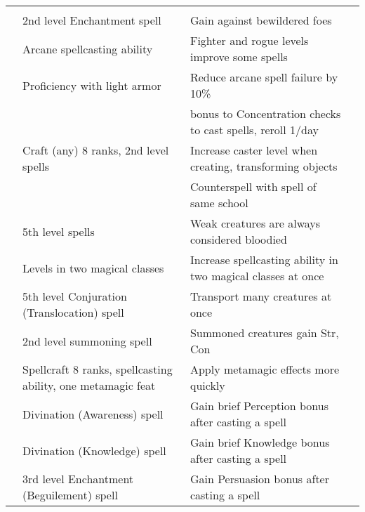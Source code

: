 {\begin{longtabu}{>{\lcol}p{10em} >{\lcol}p{15em} >{\lcol}X >{\lcol}p{3em}}
    \midrule
     &  &  &  \\
     & 2nd level Enchantment spell & Gain  against bewildered foes &  \\
     & Arcane spellcasting ability & Fighter and rogue levels improve some spells &  \\
     & Proficiency with light armor & Reduce arcane spell failure by 10\% &  \\
     & \x &   bonus to Concentration checks to cast spells, reroll 1/day &  \\
     & Craft (any) 8 ranks, 2nd level spells & Increase caster level when creating, transforming objects &  \\
     & \x &  Counterspell with spell of same school &  \\
     & 5th level spells & Weak creatures are always considered bloodied &  \\
     & Levels in two magical classes & Increase spellcasting ability in two magical classes at once &  \\
     & 5th level Conjuration (Translocation) spell & Transport many creatures at once &  \\
     & 2nd level summoning spell & Summoned creatures gain  Str,  Con &  \\
     & Spellcraft 8 ranks, spellcasting ability, one metamagic feat & Apply metamagic effects more quickly &  \\
     & Divination (Awareness) spell & Gain brief Perception bonus after casting a spell &  \\
     & Divination (Knowledge) spell & Gain brief Knowledge bonus after casting a spell &  \\
     & 3rd level Enchantment (Beguilement) spell & Gain Persuasion bonus after casting a spell &  \\

\end{longtabu}}
